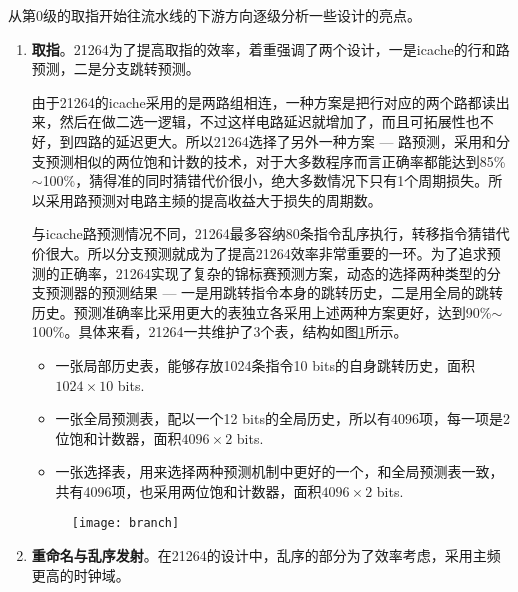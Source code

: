 	从第0级的取指开始往流水线的下游方向逐级分析一些设计的亮点。
	\begin{enumerate}[label=(\alph*)]
		\item \textbf{取指}。21264为了提高取指的效率，着重强调了两个设计，一是icache的行和路预测，二是分支跳转预测。
		
		由于21264的icache采用的是两路组相连，一种方案是把行对应的两个路都读出来，然后在做二选一逻辑，不过这样电路延迟就增加了，而且可拓展性也不好，到四路的延迟更大。所以21264选择了另外一种方案 --- 路预测，采用和分支预测相似的两位饱和计数的技术，对于大多数程序而言正确率都能达到85\%$ \sim $100\%，猜得准的同时猜错代价很小，绝大多数情况下只有1个周期\citep{Alpha21264}损失。所以采用路预测对电路主频的提高收益大于损失的周期数。
		
		与icache路预测情况不同，21264最多容纳80条指令乱序执行，转移指令猜错代价很大。所以分支预测就成为了提高21264效率非常重要的一环。为了追求预测的正确率，21264实现了复杂的锦标赛预测方案，动态的选择两种类型的分支预测器的预测结果 --- 一是用跳转指令本身的跳转历史，二是用全局的跳转历史。预测准确率比采用更大的表独立各采用上述两种方案更好，达到90\%$ \sim $100\%\citep{Alpha21264}。具体来看，21264一共维护了3个表，结构如图\ref{fig:branch_21264}所示。
		\begin{itemize}
			\item 一张局部历史表，能够存放1024条指令10 bits的自身跳转历史，面积$ 1024\times 10 $ bits.
			\item 一张全局预测表，配以一个12 bits的全局历史，所以有4096项，每一项是2位饱和计数器，面积$ 4096\times 2 $ bits.
			\item 一张选择表，用来选择两种预测机制中更好的一个，和全局预测表一致，共有4096项，也采用两位饱和计数器，面积$ 4096\times 2 $ bits.
		\end{itemize}
		\begin{figure}[!htbp]
			\centering
			\texttt{[image: branch]}
			\label{fig:branch_21264}
		\end{figure}
		\item \textbf{重命名与乱序发射}。在21264的设计中，乱序的部分为了效率考虑，采用主频更高的时钟域。
		

\end{enumerate}
